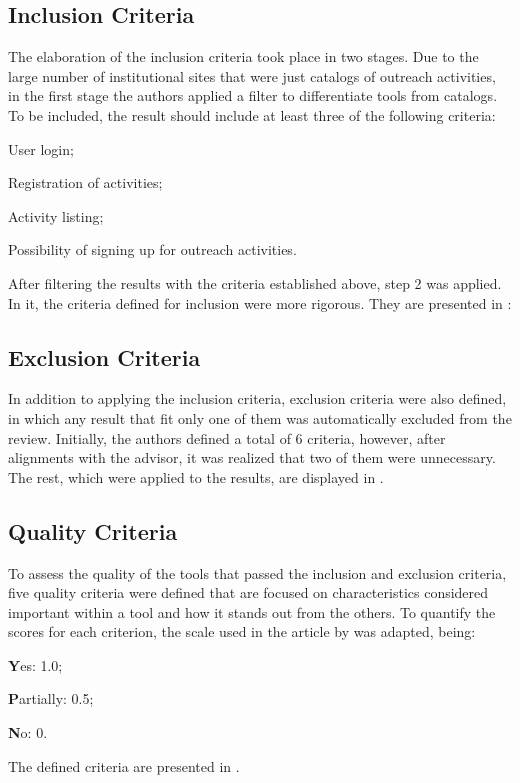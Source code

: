 \subsection{Inclusion Criteria}\label{sec:gl-planning-inc}

The elaboration of the inclusion criteria took place in two stages. Due to the large number of institutional sites that were just catalogs of outreach activities, in the first stage the authors applied a filter to differentiate tools from catalogs. To be included, the result should include at least three of the following criteria:
\begin{inparaenum}[(a)]
  \item User login;
  \item Registration of activities;
  \item Activity listing;
  \item Possibility of signing up for outreach activities.
\end{inparaenum}

After filtering the results with the criteria established above, step 2 was applied. In it, the criteria defined for inclusion were more rigorous. They are presented in :



\subsection{Exclusion Criteria}\label{sec:gl-planning-exc}

In addition to applying the inclusion criteria, exclusion criteria were also defined, in which any result that fit only one of them was automatically excluded from the review. Initially, the authors defined a total of 6 criteria, however, after alignments with the advisor, it was realized that two of them were unnecessary. The rest, which were applied to the results, are displayed in .



\subsection{Quality Criteria}\label{sec:gl-planning-qlty}

To assess the quality of the tools that passed the inclusion and exclusion criteria, five quality criteria were defined that are focused on characteristics considered important within a tool and how it stands out from the others. To quantify the scores for each criterion, the scale used in the article by \cite{iung2020systematic} was adapted, being:
\begin{inparaenum}[(i)]
  \item \textbf{Y}es: 1.0;
  \item \textbf{P}artially: 0.5;
  \item \textbf{N}o: 0.
\end{inparaenum}
The defined criteria are presented in .

